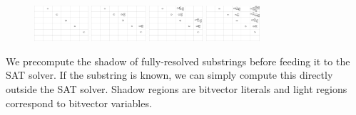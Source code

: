 \documentclass[sigplan,nonacm]{acmart}\settopmatter{printfolios=false,printccs=false,printacmref=false}
\begin{document}
\begin{figure}[H]
    \includegraphics[width=2cm]{../figures/parse1.png}
    \includegraphics[width=2cm]{../figures/parse2.png}
    \includegraphics[width=2cm]{../figures/parse3.png}
    \includegraphics[width=2cm]{../figures/parse4.png}
\end{figure}

We precompute the shadow of fully-resolved substrings before feeding it to the SAT solver. If the substring is known, we can simply compute this directly outside the SAT solver. Shadow regions are bitvector literals and light regions correspond to bitvector variables.

\newcommand\ddd{\Ddots}
\newcommand\vdd{\Vdots}
\newcommand\cdd{\Cdots}
\newcommand\lds{\ldots}
\newcommand\vno{\varnothing}
\newcommand{\ts}[1]{\textsuperscript{#1}}
\newcommand\non{1\ts{st}}
\newcommand\ntw{2\ts{nd}}
\newcommand\nth{3\ts{rd}}
\newcommand\nfo{4\ts{th}}
\newcommand\nfi{5\ts{th}}
\newcommand\nsi{6\ts{th}}
\newcommand\nse{7\ts{th}}
\newcommand{\vs}[1]{\{V\}_{\sigma_{#1}}}
\newcommand\rcr{\rowcolor{black!15}}
\newcommand\rcw{\rowcolor{white}}
\newcommand\pcd{\cdot}
\newcommand\pcp{\phantom\cdot}
\newcommand\ppp{\phantom{\nse}}
\end{document}
